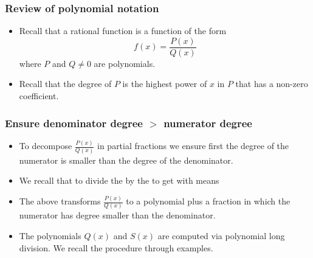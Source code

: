 \begin{frame}
\frametitle{Review of polynomial notation}
\begin{itemize}
\item Recall that a rational function is a function of the form
\[
f(x) = \frac{P(x)}{Q(x)}
\]
where $P$ and $Q\neq 0$ are polynomials. 
\item<2->Recall that the degree of $P$ is the highest power of $x$ in $P$ that has a non-zero coefficient.
\end{itemize}
\end{frame}

\begin{frame}\frametitle{Ensure denominator degree $>$ numerator degree}
\begin{itemize}
\item To decompose $\frac{P(x)}{Q(x)}$ in partial fractions we ensure first the degree of the numerator is smaller than the degree of the denominator.
\item<2-> We recall that to divide the  by the  to get  with  means 
\item<10-> The above transforms $\frac{P(x)}{Q(x)}$ to a polynomial plus a fraction in which the numerator has degree smaller than the denominator.
\item<11-> The polynomials $Q(x)$ and $S(x)$ are computed via polynomial long division. We recall the procedure through examples.
\end{itemize}
\end{frame}
